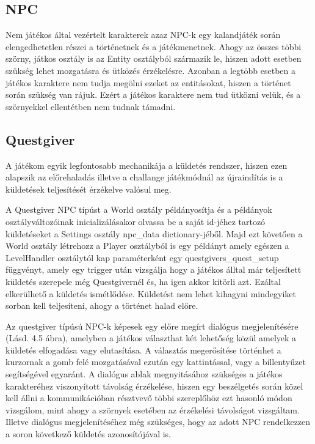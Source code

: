 \subsection{NPC}

Nem játékos által vezértelt karakterek azaz NPC-k egy kalandjáték során elengedhetetlen részei a történetnek és a játékmenetnek. Ahogy az összes többi szörny, játkos osztály is az Entity osztályból származik le, hiszen adott esetben szükség lehet mozgatásra és ütközés érzékelésre. Azonban a legtöbb esetben a játékos karaktere nem tudja megölni ezeket az entitásokat, hiszen a történet során szükség van rájuk. Ezért a játékos karaktere nem tud ütközni velük, és a szörnyekkel ellentétben nem tudnak támadni.

\subsection{Questgiver}

A játékom egyik legfontosabb mechanikája a küldetés rendszer, hiszen ezen alapszik az előrehaladás illetve a challange játékmódnál az újraindítás is a küldetések teljesítését érzékelve valósul meg. 

A Questgiver NPC típúst a World osztály példányosítja és a példányok osztályváltozóinak inicializálásakor olvassa be a saját id-jéhez tartozó küldetéseket a Settings osztály npc\_data dictionary-jéből. Majd ezt követően a World osztály létrehozz a Player osztályból is egy példányt amely egészen a LevelHandler osztálytól kap paraméterként egy questgivers\_quest\_setup függvényt, amely egy trigger után vizsgálja hogy a játékos álltal már teljesített küldetés szerepel\-e még Questgivernél és, ha igen akkor kitörli azt. Ezáltal elkerülhető a küldetés ismétlődése. Küldetést nem lehet kihagyni mindegyiket sorban kell teljesíteni, ahogy a történet halad előre.

Az questgiver típúsú NPC-k képesek egy előre megírt dialógus megjelenítésére (Lásd. 4.5 ábra), amelyben a játékos választhat két lehetőség közül amelyek a küldetés elfogadása vagy elutasítása. A választás megerősítése történhet a kurzornak a gomb felé mozgatásával ezután egy kattintással, vagy a billentyűzet segítségével egyaránt. A dialógus ablak megnyitásához szükséges a játékos karakteréhez viszonyított távolság érzékelése, hiszen egy beszélgetés során közel kell állni a kommunikációban résztvevő többi szereplőhöz ezt hasonló módon vizsgálom, mint ahogy a szörnyek esetében az érzékelési távolságot vizsgáltam. Illetve dialógus megjelenítéséhez még szükséges, hogy az adott NPC rendelkezzen a soron következő küldetés azonosítójával is.   

